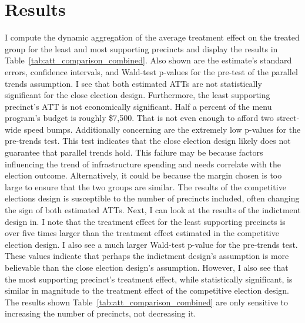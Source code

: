 \section{Results}\label{sec:results}


I compute the dynamic aggregation of the average treatment effect on the treated group for the least and most supporting precincts and display the results in Table~\ref{tab:att_comparison_combined}.
Also shown are the estimate's standard errors, confidence intervals, and Wald-test p-values for the pre-test of the parallel trends assumption.
I see that both estimated ATTs are not statistically significant for the close election design.
Furthermore, the least supporting precinct's ATT is not economically significant. 
Half a percent of the menu program's budget is roughly \$7,500. 
That is not even enough to afford two street-wide speed bumps.
Additionally concerning are the extremely low p-values for the pre-trends test.
This test indicates that the close election design likely does not guarantee that parallel trends hold.
This failure may be because factors influencing the trend of infrastructure spending and needs correlate with the election outcome.
Alternatively, it could be because the margin chosen is too large to ensure that the two groups are similar.
The results of the competitive elections design is susceptible to the number of precincts included, often changing the sign of both estimated ATTs.
Next, I can look at the results of the indictment design in.
I note that the treatment effect for the least supporting precincts is over five times larger than the treatment effect estimated in the competitive election design.
I also see a much larger Wald-test p-value for the pre-trends test.
These values indicate that perhaps the indictment design's assumption is more believable than the close election design's assumption.
However, I also see that the most supporting precinct's treatment effect, while statistically significant, is similar in magnitude to the treatment effect of the competitive election design.
The results shown Table~\ref{tab:att_comparison_combined} are only sensitive to increasing the number of precincts, not decreasing it.


